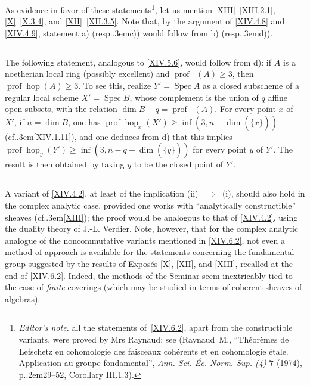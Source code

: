 \documentclass[11pt,a4paper,oneside]{book}
\providecommand{\sisi}[2]{#2}
\providecommand{\pageoriginale}{%
  \refstepcounter{pageoriginal}%
  \marginpar{\raggedright\footnotesize\bfseries\thepageoriginal}%
  \xspace}
\providecommand{\nde}[1]{\footnote{\textit{Editor's note.} #1}}
\providecommand{\og}{``}
\providecommand{\fg}{''\xspace}
\providecommand{\cf}{cf.\kern.3em}
\providecommand{\resp}{resp.\kern.3em}
\providecommand{\ptbl}{.\kern.2em}
\DeclareMathOperator{\geom}{g\acute{e}om}
\DeclareMathOperator{\hop}{hop}
\providecommand{\Spec}{\operatorname{Spec}}
\providecommand{\prof}{\operatorname{prof}}
\providecommand{\ALORS}{\unskip~$\Longrightarrow$~\ignorespaces}
\theoremstyle{plain}
\theoremstyle{definition}
\theoremstyle{remark}
\renewcommand{\Ref}[1]{\textup{\ref{#1}}}
\begin{document}
As evidence in favor of these statements\nde{\label{MiR}all the statements of~\Ref{XIV.6.2}, apart from the constructible variants, were proved by Mrs Raynaud; see (Raynaud~M., {\og Th\'eor\`emes de Lefschetz en cohomologie des faisceaux coh\'erents et en cohomologie \'etale. Application au groupe fondamental\fg}, \emph{Ann. Sci. \'Ec. Norm. Sup. (4)} \textbf{7} (1974), p\ptbl 29--52, Corollary III.1.3).}, let us mention \Ref{XIII}~\Ref{XIII.2.1}, \Ref{X}~\Ref{X.3.4}, and \Ref{XII}~\Ref{XII.3.5}. Note that, by the argument of \Ref{XIV.4.8} and \Ref{XIV.4.9}, statement a) (\resp c)) would follow from b) (\resp d)).

\subsection{\texorpdfstring{}{XIV.6.3}} \label{XIV.6.3}
The following statement, analogous to \Ref{XIV.5.6}, would follow from d): if $A$ is\pageoriginale a noetherian local ring (possibly excellent) and $\prof \geom (A) \geq 3$, then $\prof \hop (A) \geq 3$. To see this, realize $Y'=\Spec A$ as a closed subscheme of a regular local scheme $X'=\Spec B$, whose complement is the union of $q$ affine open subsets, with the relation $\dim B -q=\prof \geom(A)$. For every point $x$ of $X'$, if $n=\dim B$, one has $\prof \hop_x(X') \geq \inf(3, n-\dim(\overline{\{x\}}))$ (\cf \Ref{XIV.1.11}), and one deduces from d) that this implies $\prof \hop_y(Y') \geq \inf(3, n-q-\dim(\overline{\{y\}}))$ for every point $y$ of $Y'$. The result is then obtained by taking $y$ to be the closed point of $Y'$.

\subsection{\texorpdfstring{}{XIV.6.4}} \label{XIV.6.4}
A variant of \Ref{XIV.4.2}, at least of the implication \textup{(ii)} \ALORS \textup{(i)}, should also hold in the complex analytic case, provided one works with \og analytically constructible\fg sheaves (\cf \Ref{XIII}); the proof would be analogous to that of \Ref{XIV.4.2}, using the duality theory of J.-L. Verdier. Note, however, that for the complex analytic analogue of the noncommutative variants mentioned in \Ref{XIV.6.2}, not even a method of approach is available for the statements concerning the fundamental group suggested by the results of Expos\'{e}s \Ref{X}, \Ref{XII}, and \Ref{XIII}, recalled at the end of \Ref{XIV.6.2}. Indeed, the methods of the Seminar seem inextricably tied to the case of \emph{finite} coverings (which may be studied in terms of coherent sheaves of \sisi{Algebras}{algebras}).
\end{document}
